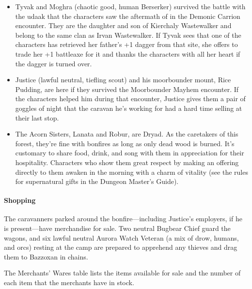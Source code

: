 \documentclass[10pt,a4paper,twoside,bg=print,twocolumn,openany,nodeprecatedcode]{dndbook}
\begin{document}
\begin{itemize}
\item Tyvak and Moghra (chaotic good, human Berserker) survived the battle with the udaak that the characters saw the aftermath of in the Demonic Carrion encounter. They are the daughter and son of Kierchaly Wastewalker and belong to the same clan as Irvan Wastewalker. If Tyvak sees that one of the characters has retrieved her father's +1 dagger from that site, she offers to trade her +1 battleaxe for it and thanks the characters with all her heart if the dagger is turned over.
\item Justice (lawful neutral, tiefling scout) and his moorbounder mount, Rice Pudding, are here if they survived the Moorbounder Mayhem encounter. If the characters helped him during that encounter, Justice gives them a pair of goggles of night that the caravan he's working for had a hard time selling at their last stop.
\item The Acorn Sisters, Lanata and Robur, are Dryad. As the caretakers of this forest, they're fine with bonfires as long as only dead wood is burned. It's customary to share food, drink, and song with them in appreciation for their hospitality. Characters who show them great respect by making an offering directly to them awaken in the morning with a charm of vitality (see the rules for supernatural gifts in the Dungeon Master's Guide).
\end{itemize}

\paragraph{Shopping}
The caravanners parked around the bonfire—including Justice's employers, if he is present—have merchandise for sale. Two neutral Bugbear Chief guard the wagons, and six lawful neutral Aurora Watch Veteran (a mix of drow, humans, and orcs) resting at the camp are prepared to apprehend any thieves and drag them to Bazzoxan in chains.

The Merchants' Wares table lists the items available for sale and the number of each item that the merchants have in stock.
\end{document}
